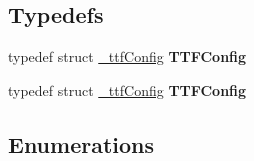 \subsection*{Typedefs}
\begin{DoxyCompactItemize}
\item 
\mbox{\label{group____2d_gafb5a75091e8f89a4f7b02dab0722ffa3}} 
typedef struct \hyperlink{struct__ttfConfig}{\+\_\+ttf\+Config} {\bfseries T\+T\+F\+Config}
\item 
\mbox{\label{group____2d_gafb5a75091e8f89a4f7b02dab0722ffa3}} 
typedef struct \hyperlink{struct__ttfConfig}{\+\_\+ttf\+Config} {\bfseries T\+T\+F\+Config}
\end{DoxyCompactItemize}
\subsection*{Enumerations}
